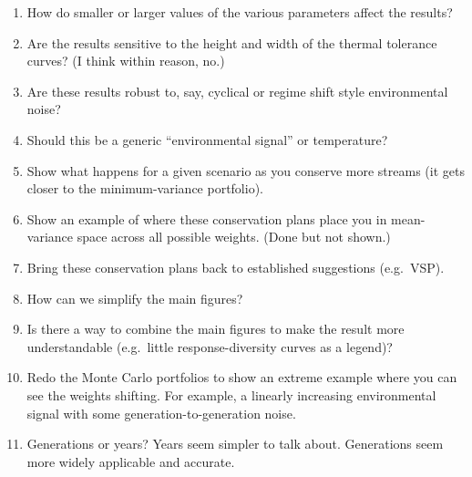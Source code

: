\documentclass[12pt]{article}
\begin{document}
\begin{enumerate}
\def\labelenumi{\arabic{enumi}.}
\itemsep1pt\parskip0pt
\item
  How do smaller or larger values of the various parameters affect the
  results?
\item
  Are the results sensitive to the height and width of the thermal
  tolerance curves? (I think within reason, no.)
\item
  Are these results robust to, say, cyclical or regime shift style
  environmental noise?
\item
  Should this be a generic ``environmental signal'' or temperature?
\item
  Show what happens for a given scenario as you conserve more streams
  (it gets closer to the minimum-variance portfolio).
\item
  Show an example of where these conservation plans place you in
  mean-variance space across all possible weights. (Done but not shown.)
\item
  Bring these conservation plans back to established suggestions
  (e.g.~VSP).
\item
  How can we simplify the main figures?
\item
  Is there a way to combine the main figures to make the result more
  understandable (e.g.~little response-diversity curves as a legend)?
\item
  Redo the Monte Carlo portfolios to show an extreme example where you
  can see the weights shifting. For example, a linearly increasing
  environmental signal with some generation-to-generation noise.
\item
  Generations or years? Years seem simpler to talk about. Generations
  seem more widely applicable and accurate.
\end{enumerate}

\clearpage



\renewcommand\refname{References}

\end{document}
